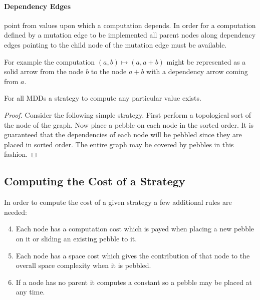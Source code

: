 \paragraph{Dependency Edges} point from values upon which a computation
depends. In order for a computation defined by a mutation edge to be implemented
all parent nodes along dependency edges pointing to the child node of the
mutation edge must be available.

For example the computation $(a,b)\mapsto(a,a+b)$ might be represented as a
solid arrow from the node $b$ to the node $a+b$ with a dependency arrow coming
from $a$.


\begin{theorem}
  For all MDDs a strategy to compute any particular value exists.
\end{theorem}

\begin{proof}

  Consider the following simple strategy.  First perform a topological sort of
  the node of the graph.  Now place a pebble on each node in the sorted order.
  It is guaranteed that the dependencies of each node will be pebbled since they
  are placed in sorted order. The entire graph may be covered by pebbles in this
  fashion.

\end{proof}



\subsection{Computing the Cost of a Strategy}

In order to compute the cost of a given strategy a few additional rules are
needed:

\begin{enumerate}
    \setcounter{enumi}{3}
  \item Each node has a computation cost which is payed when placing a new pebble on
    it or sliding an existing pebble to it.
  \item Each node has a space cost which gives the contribution of that node to
    the overall space complexity when it is pebbled.
  \item If a node has no parent it computes a constant so a pebble may be placed
    at any time.
\end{enumerate}

